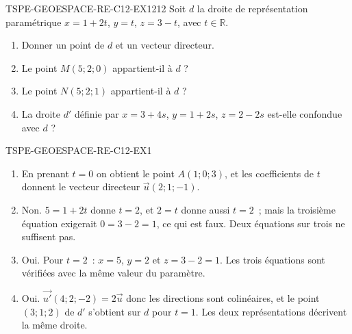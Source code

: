 
\begin{exercice}{TSPE-GEOESPACE-RE-C12-EX1}{2}{12}
Soit $d$ la droite de représentation paramétrique
$x=1+2t$, $y=t$, $z=3-t$, avec $t\in\mathbb{R}$.
\begin{enumerate}
  \item Donner un point de $d$ et un vecteur directeur.
  \item Le point $M(5;2;0)$ appartient-il à $d$ ?
  \item Le point $N(5;2;1)$ appartient-il à $d$ ?
  \item La droite $d'$ définie par $x=3+4s$, $y=1+2s$, $z=2-2s$ est-elle
        confondue avec $d$ ?
\end{enumerate}
\end{exercice}


\begin{corrige}{TSPE-GEOESPACE-RE-C12-EX1}
\begin{enumerate}
  \item En prenant $t=0$ on obtient le point $A(1;0;3)$, et les coefficients
        de $t$ donnent le vecteur directeur $\vec{u}(2;1;-1)$.
  \item Non. $5=1+2t$ donne $t=2$, et $2=t$ donne aussi $t=2$~; mais la
        troisième équation exigerait $0=3-2=1$, ce qui est faux. Deux
        équations sur trois ne suffisent pas.
  \item Oui. Pour $t=2$~: $x=5$, $y=2$ et $z=3-2=1$. Les trois équations sont
        vérifiées avec la même valeur du paramètre.
  \item Oui. $\vec{u'}(4;2;-2)=2\vec{u}$ donc les directions sont colinéaires,
        et le point $(3;1;2)$ de $d'$ s'obtient sur $d$ pour $t=1$. Les deux
        représentations décrivent la même droite.
\end{enumerate}
\end{corrige}
